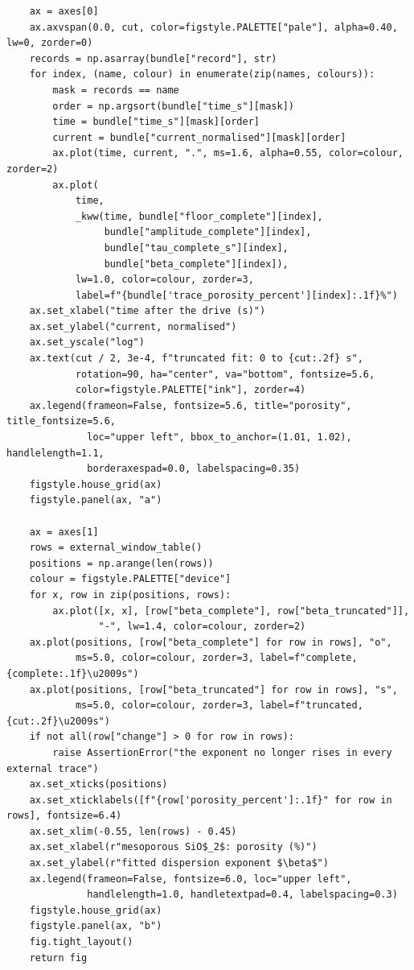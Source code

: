 \documentclass[a4paper,10pt]{article}
\begin{document}
\begin{Verbatim}
    ax = axes[0]
    ax.axvspan(0.0, cut, color=figstyle.PALETTE["pale"], alpha=0.40, lw=0, zorder=0)
    records = np.asarray(bundle["record"], str)
    for index, (name, colour) in enumerate(zip(names, colours)):
        mask = records == name
        order = np.argsort(bundle["time_s"][mask])
        time = bundle["time_s"][mask][order]
        current = bundle["current_normalised"][mask][order]
        ax.plot(time, current, ".", ms=1.6, alpha=0.55, color=colour, zorder=2)
        ax.plot(
            time,
            _kww(time, bundle["floor_complete"][index],
                 bundle["amplitude_complete"][index],
                 bundle["tau_complete_s"][index],
                 bundle["beta_complete"][index]),
            lw=1.0, color=colour, zorder=3,
            label=f"{bundle['trace_porosity_percent'][index]:.1f}%")
    ax.set_xlabel("time after the drive (s)")
    ax.set_ylabel("current, normalised")
    ax.set_yscale("log")
    ax.text(cut / 2, 3e-4, f"truncated fit: 0 to {cut:.2f} s",
            rotation=90, ha="center", va="bottom", fontsize=5.6,
            color=figstyle.PALETTE["ink"], zorder=4)
    ax.legend(frameon=False, fontsize=5.6, title="porosity", title_fontsize=5.6,
              loc="upper left", bbox_to_anchor=(1.01, 1.02), handlelength=1.1,
              borderaxespad=0.0, labelspacing=0.35)
    figstyle.house_grid(ax)
    figstyle.panel(ax, "a")

    ax = axes[1]
    rows = external_window_table()
    positions = np.arange(len(rows))
    colour = figstyle.PALETTE["device"]
    for x, row in zip(positions, rows):
        ax.plot([x, x], [row["beta_complete"], row["beta_truncated"]],
                "-", lw=1.4, color=colour, zorder=2)
    ax.plot(positions, [row["beta_complete"] for row in rows], "o",
            ms=5.0, color=colour, zorder=3, label=f"complete, {complete:.1f}\u2009s")
    ax.plot(positions, [row["beta_truncated"] for row in rows], "s",
            ms=5.0, color=colour, zorder=3, label=f"truncated, {cut:.2f}\u2009s")
    if not all(row["change"] > 0 for row in rows):
        raise AssertionError("the exponent no longer rises in every external trace")
    ax.set_xticks(positions)
    ax.set_xticklabels([f"{row['porosity_percent']:.1f}" for row in rows], fontsize=6.4)
    ax.set_xlim(-0.55, len(rows) - 0.45)
    ax.set_xlabel(r"mesoporous SiO$_2$: porosity (%)")
    ax.set_ylabel(r"fitted dispersion exponent $\beta$")
    ax.legend(frameon=False, fontsize=6.0, loc="upper left",
              handlelength=1.0, handletextpad=0.4, labelspacing=0.3)
    figstyle.house_grid(ax)
    figstyle.panel(ax, "b")
    fig.tight_layout()
    return fig
\end{Verbatim}
\end{document}
